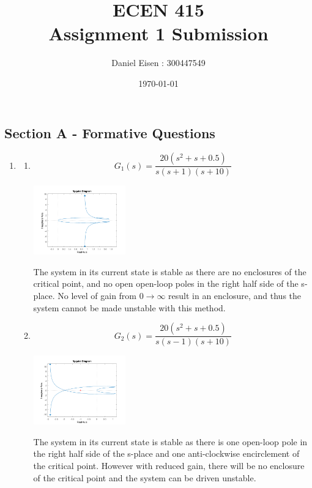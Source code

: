 \documentclass[11pt]{article}
\title{ECEN 415 \\ Assignment 1 Submission}
\author{Daniel Eisen : 300447549}
\date{\today}
\begin{document}
\begin{preview}
\maketitle

\section*{Section A - Formative Questions}
\begin{enumerate}
    \item 
    \begin{enumerate}
        \item 
        $$G_1(s) = \frac{20(s^2 + s + 0.5)}{s(s+1)(s+10)}$$
        \begin{center}
            \includegraphics[width=0.33\textwidth]{fig/1a.png}
        \end{center}
        The system in its current state is stable as there are no enclosures of the critical point, and no open open-loop poles in the right half side of the s-place. No level of gain from $0 \rightarrow \infty$ result in an enclosure, and thus the system cannot be made unstable with this method.  
        \item 
        $$G_2(s) = \frac{20(s^2 + s + 0.5)}{s(s-1)(s+10)}$$
        \begin{center}
            \includegraphics[width=0.33\textwidth]{fig/1b.png}
        \end{center}
        The system in its current state is stable as there is one open-loop pole in the right half side of the s-place and one anti-clockwise encirclement of the critical point. However with reduced gain, there will be no enclosure of the critical point and the system can be driven unstable.

\end{enumerate}
\end{enumerate}
\end{preview}
\end{document}
